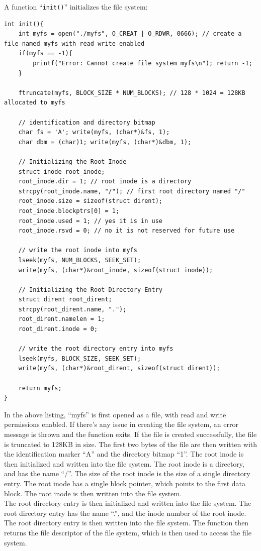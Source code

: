 \documentclass{article}
\theoremstyle{mytheoremstyle}
\theoremstyle{mytheoremstyle}
\theoremstyle{myproblemstyle}
\begin{document}
\noindent A function ``\texttt{init()}'' initializes the file system:
    \begin{lstlisting}[caption={Initialization of MYFS}, label={lst:init}]
int init(){
    int myfs = open("./myfs", O_CREAT | O_RDWR, 0666); // create a file named myfs with read write enabled
    if(myfs == -1){
        printf("Error: Cannot create file system myfs\n"); return -1;
    }

    ftruncate(myfs, BLOCK_SIZE * NUM_BLOCKS); // 128 * 1024 = 128KB allocated to myfs

    // identification and directory bitmap
    char fs = 'A'; write(myfs, (char*)&fs, 1);
    char dbm = (char)1; write(myfs, (char*)&dbm, 1);

    // Initializing the Root Inode
    struct inode root_inode;
    root_inode.dir = 1; // root inode is a directory
    strcpy(root_inode.name, "/"); // first root directory named "/"
    root_inode.size = sizeof(struct dirent);
    root_inode.blockptrs[0] = 1;
    root_inode.used = 1; // yes it is in use
    root_inode.rsvd = 0; // no it is not reserved for future use
    
    // write the root inode into myfs
    lseek(myfs, NUM_BLOCKS, SEEK_SET); 
    write(myfs, (char*)&root_inode, sizeof(struct inode));

    // Initializing the Root Directory Entry
    struct dirent root_dirent;
    strcpy(root_dirent.name, ".");
    root_dirent.namelen = 1;
    root_dirent.inode = 0;

    // write the root directory entry into myfs
    lseek(myfs, BLOCK_SIZE, SEEK_SET); 
    write(myfs, (char*)&root_dirent, sizeof(struct dirent));

    return myfs;
}
\end{lstlisting}
In the above listing, ``myfs'' is first opened as a file, with read and write permissions enabled. If there's any issue in creating the file system, an error message is thrown and the function exits. If the file is created successfully, the file is truncated to 128KB in size. The first two bytes of the file are then written with the identification marker ``A'' and the directory bitmap ``1''. The root inode is then initialized and written into the file system. The root inode is a directory, and has the name ``/''. The size of the root inode is the size of a single directory entry. The root inode has a single block pointer, which points to the first data block. The root inode is then written into the file system. \\ The root directory entry is then initialized and written into the file system. The root directory entry has the name ``.'', and the inode number of the root inode. The root directory entry is then written into the file system. The function then returns the file descriptor of the file system, which is then used to access the file system.
\end{document}
